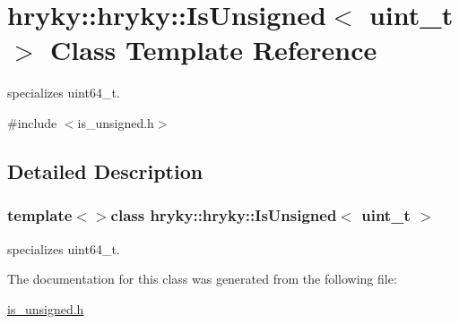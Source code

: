 \hypertarget{classhryky_1_1hryky_1_1_is_unsigned_3_01uint__t_01_4}{\section{hryky\-:\-:hryky\-:\-:Is\-Unsigned$<$ uint\-\_\-t $>$ Class Template Reference}
\label{classhryky_1_1hryky_1_1_is_unsigned_3_01uint__t_01_4}
}


specializes uint64\-\_\-t.  




{\ttfamily \#include $<$is\-\_\-unsigned.\-h$>$}



\subsection{Detailed Description}
\subsubsection*{template$<$$>$class hryky\-::hryky\-::\-Is\-Unsigned$<$ uint\-\_\-t $>$}

specializes uint64\-\_\-t. 

The documentation for this class was generated from the following file\-:\begin{DoxyCompactItemize}
\item 
\hyperlink{is__unsigned_8h}{is\-\_\-unsigned.\-h}\end{DoxyCompactItemize}
